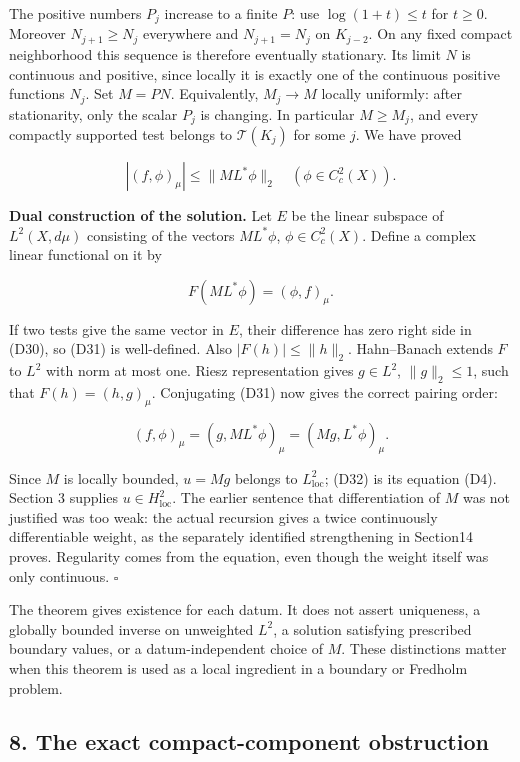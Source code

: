\documentclass[
  11pt,
]{article}
\begin{document}
The positive numbers \(P_j\) increase to a finite \(P\): use
\(\log(1+t)\leq t\) for \(t\geq0\). Moreover \(N_{j+1}\geq N_j\)
everywhere and \(N_{j+1}=N_j\) on \(K_{j-2}\). On any fixed compact
neighborhood this sequence is therefore eventually stationary. Its limit
\(N\) is continuous and positive, since locally it is exactly one of the
continuous positive functions \(N_j\). Set \(M=PN\). Equivalently,
\(M_j\to M\) locally uniformly: after stationarity, only the scalar
\(P_j\) is changing. In particular \(M\geq M_j\), and every compactly
supported test belongs to \(\mathcal T(K_j)\) for some \(j\). We have
proved

\[
                  |(f,\phi)_\mu|\leq\|ML^*\phi\|_2
                                   \quad(\phi\in C_c^2(X)).    \tag{D30}
\]

\textbf{Dual construction of the solution.} Let \(E\) be the linear
subspace of \(L^2(X,d\mu)\) consisting of the vectors \(ML^*\phi\),
\(\phi\in C_c^2(X)\). Define a complex linear functional on it by

\[
                  F(ML^*\phi)=(\phi,f)_\mu.                    \tag{D31}
\]

If two tests give the same vector in \(E\), their difference has zero
right side in (D30), so (D31) is well-defined. Also
\(|F(h)|\leq\|h\|_2\). Hahn--Banach extends \(F\) to \(L^2\) with norm
at most one. Riesz representation gives \(g\in L^2\), \(\|g\|_2\leq1\),
such that \(F(h)=(h,g)_\mu\). Conjugating (D31) now gives the correct
pairing order:

\[
          (f,\phi)_\mu=(g,ML^*\phi)_\mu=(Mg,L^*\phi)_\mu.       \tag{D32}
\]

Since \(M\) is locally bounded, \(u=Mg\) belongs to
\(L^2_{\mathrm{loc}}\); (D32) is its equation (D4). Section 3 supplies
\(u\in H^2_{\mathrm{loc}}\). The earlier sentence that differentiation
of \(M\) was not justified was too weak: the actual recursion gives a
twice continuously differentiable weight, as the separately identified
strengthening in Section14 proves. Regularity comes from the equation,
even though the weight itself was only continuous. \(\square\)

The theorem gives existence for each datum. It does not assert
uniqueness, a globally bounded inverse on unweighted \(L^2\), a solution
satisfying prescribed boundary values, or a datum-independent choice of
\(M\). These distinctions matter when this theorem is used as a local
ingredient in a boundary or Fredholm problem.

\subsection{8. The exact compact-component
obstruction}\label{the-exact-compact-component-obstruction}
\end{document}
